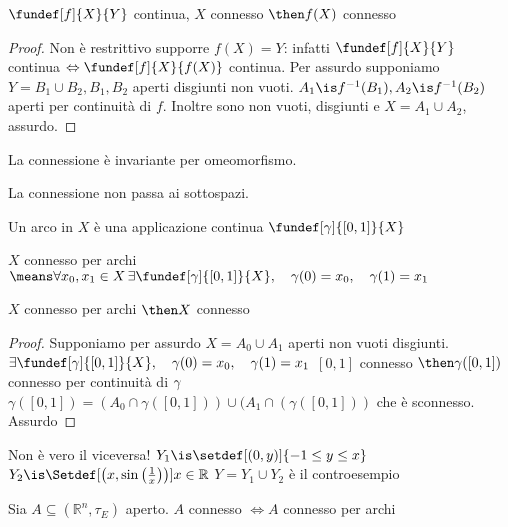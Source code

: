 
\begin{teo}
 $\fundef[f]{X}{Y}$ continua, $X$ connesso $\then f(X)$ connesso 
\end{teo}
\begin{proof}
  Non è restrittivo supporre $f(X)=Y$: infatti $\fundef[f]{X}{Y}$ continua $\Leftrightarrow \fundef[f]{X}{f(X)}$ continua.
 Per assurdo supponiamo $Y = B_1 \cup B_2, B_1,B_2$ aperti disgiunti non vuoti.
 $A_1\is f^{-1}(B_1), A_2\is f^{-1}(B_2)$ aperti per continuità di $f$.
 Inoltre sono non vuoti, disgiunti e $X=A_1\cup A_2$, assurdo.
\end{proof}
\begin{cor}
 La connessione è invariante per omeomorfismo. 
\end{cor}
\begin{oss}
 La connessione non passa ai sottospazi.
\end{oss}
\begin{defn}[Arco]
 Un arco in $X$ è una applicazione continua $\fundef[\gamma]{[0,1]}{X}$
\end{defn}
\begin{defn}
 $X$ connesso per archi $\means \forall x_0, x_1 \in X \,\exists \fundef[\gamma]{[0,1]}{X},\quad \gamma(0)=x_0,\quad \gamma(1)=x_1$
\end{defn}
\begin{prop}
 $X$ connesso per archi $\then X$ connesso
\end{prop}
\begin{proof}
 Supponiamo per assurdo $X=A_0\cup A_1$ aperti non vuoti disgiunti.
 $\exists \fundef[\gamma]{[0,1]}{X},\quad \gamma(0)=x_0,\quad \gamma(1)=x_1\\$
 $[0,1]$ connesso $\then \gamma([0,1])$ connesso per continuità di $\gamma\\$
 $\gamma([0,1])=(A_0\cap \gamma([0,1])) \cup (A_1\cap(\gamma([0,1]))$ che è sconnesso. Assurdo
\end{proof}
\begin{es}
 Non è vero il viceversa!
 $Y_1\is\setdef[(0,y)]{-1\le y \le x}\\$
 $Y_2\is\Setdef[\left(x,\sin\left(\frac{1}{x}\right)\right)]{x\in \mathbb R}\\$
 $Y=Y_1\cup Y_2$ è il controesempio 
\end{es}
\begin{prop}
 Sia $A\subseteq (\mathbb R^n, \tau _E)$ aperto.
 $A$ connesso $\iff A$ connesso per archi
\end{prop}
